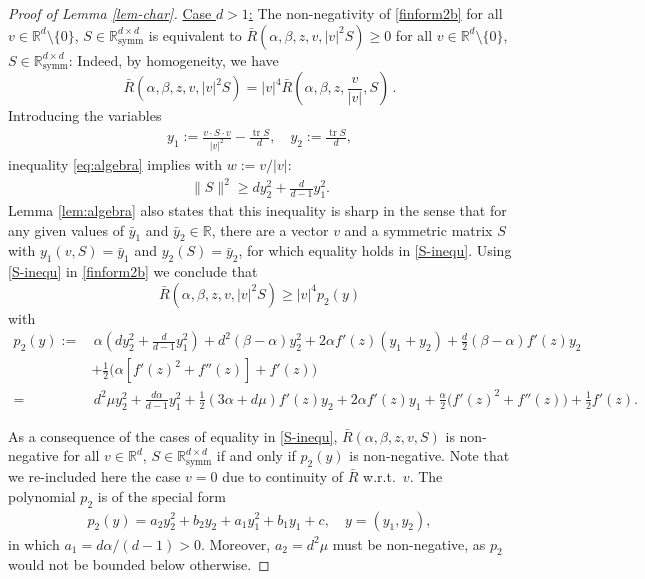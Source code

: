 \documentclass[reqno]{amsart}
\newcommand{\tr}{\operatorname{tr}}
\newcommand{\R}{\mathbb{R}}
\begin{document}
\begin{proof}[Proof of Lemma \ref{lem-char}]
\noindent
\underline{Case $d>1$:} 
The non-negativity of \eqref{finform2b} for all $v\in\R^d\setminus \{0\}$, $S\in\R^{d\times d}_{\text{symm}}$ is equivalent to $\bar R(\alpha,\beta,z,v,|v|^2 S)\geq 0$ for all $v\in\R^d\setminus \{0\}$, $S\in\R^{d\times d}_{\text{symm}}$: Indeed, by homogeneity, we have
$$
\bar R(\alpha,\beta,z,v,|v|^2 S)=|v|^4 \bar R\left(\alpha,\beta,z,\frac{v}{|v|}, S\right)\,.
$$
Introducing the variables
  \begin{align*}
y_1:=\frac{v\cdot S\cdot v}{|v|^2} - \frac{\tr S}{d},      \quad
    y_2:=\frac{\tr S}{d}, 
\end{align*}
  inequality \eqref{eq:algebra} implies with $w:=v/|v|$:
  \begin{align}\label{S-inequ}
    \|S\|^2 \ge d y_2^2 + \frac{d}{d-1}y_1^2.
  \end{align}
Lemma \ref{lem:algebra} also states that this inequality is sharp in the sense that for any given values of $\bar y_1$ and $\bar y_2\in\R$,
  there are a vector $v$ and a symmetric matrix $S$ with $y_1(v,S)=\bar y_1$ and $y_2(S)=\bar y_2$, 
  for which equality holds in \eqref{S-inequ}.
Using \eqref{S-inequ} in \eqref{finform2b} we conclude that
  $$
  \bar R(\alpha,\beta,z,v,|v|^2S)\geq |v|^4 p_2(y)
  $$ 
with
  \begin{align*}
    p_2(y) := &\,\alpha\left(d y_2^2 + \frac{d}{d-1}y_1^2\right) + d^2(\beta-\alpha) y_2^2 
       +2\alpha f'(z) (y_1+y_2) + \frac{d}2(\beta-\alpha) f'(z) y_2  \\
       &+\frac12\big(\alpha[f'(z)^2+f''(z)]+f'(z)\big) \\
             =&\, d^2\mu y_2^2+\frac{d\alpha}{d-1}y_1^2 +\frac12(3\alpha+d\mu)f'(z)y_2+2\alpha f'(z)y_1+\frac\alpha2\big(f'(z)^2+f''(z)\big)+\frac12f'(z).
  \end{align*}

As a consequence of the cases of equality in \eqref{S-inequ}, $\bar R(\alpha,\beta,z,v,S)$
is non-negative for all $v\in\R^d$, $S\in\R^{d\times d}_{\text{symm}}$ if and only if $p_2(y)$ is non-negative. Note that we re-included here the case $v=0$ due to continuity of $\bar R$ w.r.t.\ $v$. 
The polynomial $p_2$ is of the special form
  \begin{align*}
    p_2(y) = a_2y_2^2+b_2y_2+a_1y_1^2+b_1y_1+c, \quad y=(y_1,y_2),
  \end{align*}
in which $a_1=d\alpha/(d-1)>0$. Moreover, $a_2=d^2\mu$ must be non-negative, as $p_2$ would not be bounded below otherwise.


\end{proof}
\end{document}
